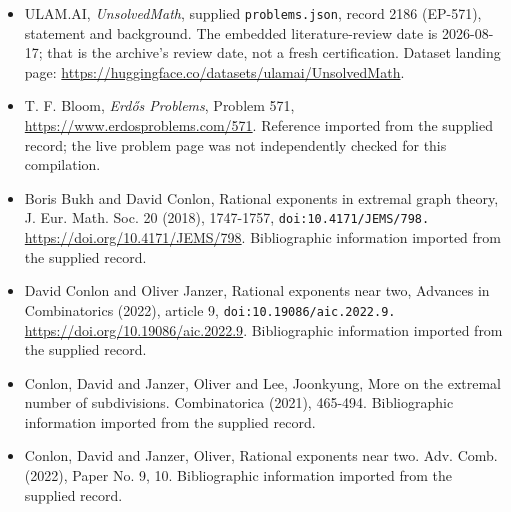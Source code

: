 \documentclass[11pt,a4paper]{article}
\begin{document}
{\small

\begin{itemize}

\item[\hypertarget{source:2186:1}{S1}] ULAM.AI, \emph{UnsolvedMath}, supplied \texttt{problems.json}, record 2186 (EP-571), statement and background. The embedded literature-review date is 2026-08-17; that is the archive’s review date, not a fresh certification. Dataset landing page: \url{https://huggingface.co/datasets/ulamai/UnsolvedMath}.

\item[\hypertarget{source:2186:2}{S2}] T. F. Bloom, \emph{Erdős Problems}, Problem 571, \url{https://www.erdosproblems.com/571}. Reference imported from the supplied record; the live problem page was not independently checked for this compilation.

\item[\hypertarget{source:2186:3}{S3}] Boris Bukh and David Conlon, Rational exponents in extremal graph theory, J. Eur. Math. Soc. 20 (2018), 1747-1757, \nolinkurl{doi:10.4171/JEMS/798.} \url{https://doi.org/10.4171/JEMS/798}. Bibliographic information imported from the supplied record.

\item[\hypertarget{source:2186:4}{S4}] David Conlon and Oliver Janzer, Rational exponents near two, Advances in Combinatorics (2022), article 9, \nolinkurl{doi:10.19086/aic.2022.9.} \url{https://doi.org/10.19086/aic.2022.9}. Bibliographic information imported from the supplied record.

\item[\hypertarget{source:2186:5}{S5}] Conlon, David and Janzer, Oliver and Lee, Joonkyung, More on the extremal number of subdivisions. Combinatorica (2021), 465-494. Bibliographic information imported from the supplied record.

\item[\hypertarget{source:2186:6}{S6}] Conlon, David and Janzer, Oliver, Rational exponents near two. Adv. Comb. (2022), Paper No. 9, 10. Bibliographic information imported from the supplied record.

\end{itemize}

}

\label{end:2186}
\end{document}
